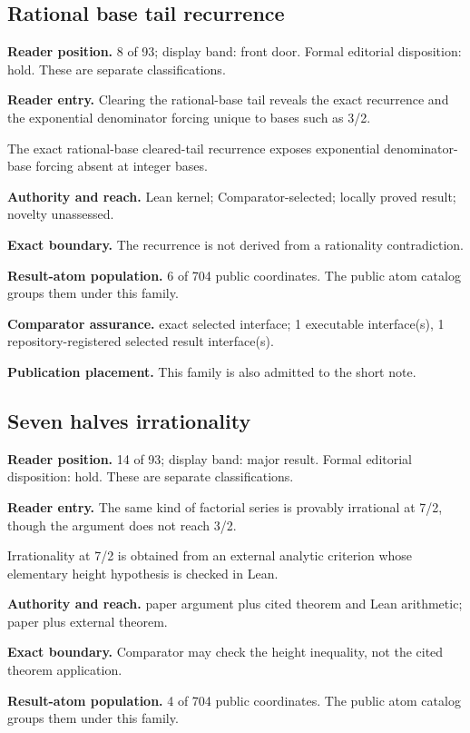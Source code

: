 \documentclass[11pt]{article}
\begin{document}
\subsection{Rational base tail recurrence}
\textbf{Reader position.} 8 of 93; display band: front door.  Formal editorial disposition: hold.  These are separate classifications.

\textbf{Reader entry.} Clearing the rational-base tail reveals the exact recurrence and the exponential denominator forcing unique to bases such as 3/2.

The exact rational-base cleared-tail recurrence exposes exponential denominator-base forcing absent at integer bases.

\textbf{Authority and reach.} Lean kernel; Comparator-selected; locally proved result; novelty unassessed.

\textbf{Exact boundary.} The recurrence is not derived from a rationality contradiction.

\textbf{Result-atom population.} 6 of 704 public coordinates. The public atom catalog groups them under this family.

\textbf{Comparator assurance.} exact selected interface; 1 executable interface(s), 1 repository-registered selected result interface(s).

\textbf{Publication placement.} This family is also admitted to the short note.

\subsection{Seven halves irrationality}
\textbf{Reader position.} 14 of 93; display band: major result.  Formal editorial disposition: hold.  These are separate classifications.

\textbf{Reader entry.} The same kind of factorial series is provably irrational at 7/2, though the argument does not reach 3/2.

Irrationality at 7/2 is obtained from an external analytic criterion whose elementary height hypothesis is checked in Lean.

\textbf{Authority and reach.} paper argument plus cited theorem and Lean arithmetic; paper plus external theorem.

\textbf{Exact boundary.} Comparator may check the height inequality, not the cited theorem application.

\textbf{Result-atom population.} 4 of 704 public coordinates. The public atom catalog groups them under this family.
\end{document}
